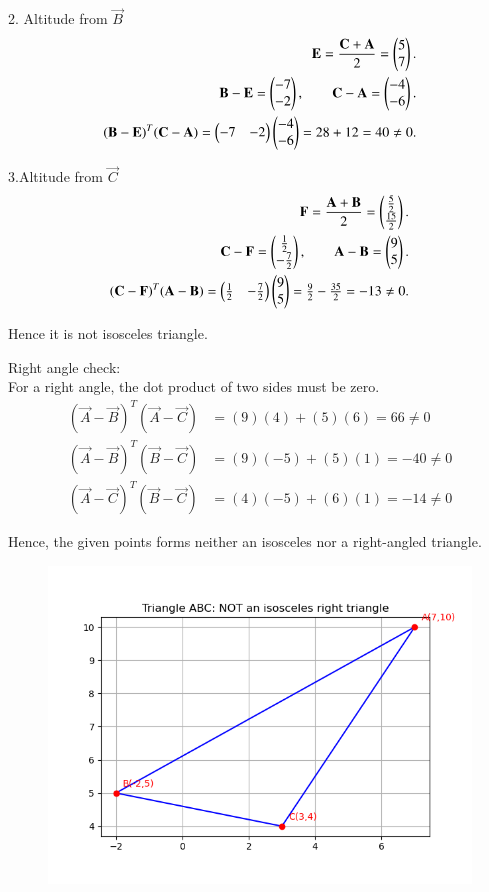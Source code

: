 \documentclass[journal]{article}
\begin{document}
2. Altitude from $\vec{B}$
\begin{align}
\mathbf{E}=\frac{\mathbf{C}+\mathbf{A}}{2}
=\begin{pmatrix}5\\7\end{pmatrix}.\\
\mathbf{B}-\mathbf{E}=\begin{pmatrix}-7\\-2\end{pmatrix},\qquad
\mathbf{C}-\mathbf{A}=\begin{pmatrix}-4\\-6\end{pmatrix}.\\
(\mathbf{B}-\mathbf{E})^{T}(\mathbf{C}-\mathbf{A})
=\begin{pmatrix}-7 & -2\end{pmatrix}\begin{pmatrix}-4\\-6\end{pmatrix}
=28+12=40\neq 0.
\end{align}
 

3.Altitude from $\vec{C}$
\begin{align}
\mathbf{F}=\frac{\mathbf{A}+\mathbf{B}}{2}
=\begin{pmatrix}\tfrac{5}{2}\\\tfrac{15}{2}\end{pmatrix}.\\
\mathbf{C}-\mathbf{F}=\begin{pmatrix}\tfrac{1}{2}\\-\tfrac{7}{2}\end{pmatrix},\qquad
\mathbf{A}-\mathbf{B}=\begin{pmatrix}9\\5\end{pmatrix}.\\
(\mathbf{C}-\mathbf{F})^{T}(\mathbf{A}-\mathbf{B})
=\begin{pmatrix}\tfrac{1}{2} & -\tfrac{7}{2}\end{pmatrix}
\begin{pmatrix}9\\5\end{pmatrix}
=\tfrac{9}{2}-\tfrac{35}{2}=-13\neq0.
\end{align}
\begin{center}    
Hence it is not isosceles triangle.
\end{center}

Right angle check:\\

For a right angle, the dot product of two sides must be zero.
\begin{align}
(\vec{A}-\vec{B})^T(\vec{A}-\vec{C}) &= (9)(4) + (5)(6) = 66 \neq 0 \\
(\vec{A}-\vec{B})^T(\vec{B}-\vec{C}) &= (9)(-5) + (5)(1) = -40 \neq 0 \\
(\vec{A}-\vec{C})^T(\vec{B}-\vec{C}) &= (4)(-5) + (6)(1) = -14 \neq 0
\end{align}

Hence, the given points forms neither an isosceles nor a right-angled triangle.
\newpage
\begin{figure}
    \centering
    \includegraphics[width=1.0\linewidth]{fig1.png}
    \caption{}
    \label{fig:placeholder}
\end{figure}
\end{document}

